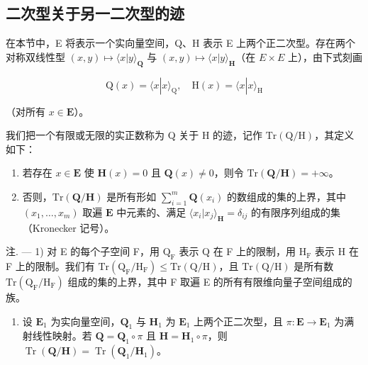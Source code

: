 \subsection{二次型关于另一二次型的迹}

在本节中，E 将表示一个实向量空间，Q、H 表示 E 上两个正二次型。存在两个对称双线性型 \((x, y) \mapsto \langle x | y \rangle_{\mathbf{Q}}\) 与 \((x, y) \mapsto \langle x | y \rangle_{\mathbf{H}}\)（在 \(E \times E\) 上），由下式刻画

\[
\mathrm{Q} (x) = \langle x | x \rangle_ {\mathrm{Q}}, \quad \mathrm{H} (x) = \langle x | x \rangle_ {\mathrm{H}}
\]

（对所有 \(x \in \mathbf{E}\)）。

我们把一个有限或无限的实正数称为 Q 关于 H 的迹，记作 \(\mathrm{Tr}(\mathrm{Q}/\mathrm{H})\)，其定义如下：

\begin{enumerate}
\def\labelenumi{\alph{enumi})}
\tightlist
\item
  若存在 \(x \in \mathbf{E}\) 使 \(\mathbf{H}(x) = 0\) 且 \(\mathbf{Q}(x) \neq 0\)，则令 \(\mathrm{Tr}(\mathbf{Q} / \mathbf{H}) = +\infty\)。
\item
  否则，\(\mathrm{Tr}(\mathbf{Q} / \mathbf{H})\) 是所有形如 \(\sum_{i=1}^{m} \mathbf{Q}(x_i)\) 的数组成的集的上界，其中 \((x_1, \ldots, x_m)\) 取遍 \(\mathbf{E}\) 中元素的、满足 \(\langle x_i | x_j \rangle_{\mathbf{H}} = \delta_{ij}\) 的有限序列组成的集（Kronecker 记号）。
\end{enumerate}

注. --- 1) 对 E 的每个子空间 F，用 \(\mathrm{Q}_{\mathrm{F}}\) 表示 Q 在 F 上的限制，用 \(\mathrm{H}_{\mathrm{F}}\) 表示 H 在 F 上的限制。我们有 \(\mathrm{Tr}(\mathrm{Q}_{\mathrm{F}} / \mathrm{H}_{\mathrm{F}}) \leqslant \mathrm{Tr}(\mathrm{Q} / \mathrm{H})\)，且 \(\mathrm{Tr}(\mathrm{Q} / \mathrm{H})\) 是所有数 \(\mathrm{Tr}(\mathrm{Q}_{\mathrm{F}} / \mathrm{H}_{\mathrm{F}})\) 组成的集的上界，其中 F 取遍 E 的所有有限维向量子空间组成的族。

\begin{enumerate}
\def\labelenumi{\arabic{enumi})}
\setcounter{enumi}{1}
\tightlist
\item
  设 \(\mathbf{E}_1\) 为实向量空间，\(\mathbf{Q}_1\) 与 \(\mathbf{H}_1\) 为 \(\mathbf{E}_1\) 上两个正二次型，且 \(\pi: \mathbf{E} \to \mathbf{E}_1\) 为满射线性映射。若 \(\mathbf{Q} = \mathbf{Q}_1 \circ \pi\) 且 \(\mathbf{H} = \mathbf{H}_1 \circ \pi\)，则 \(\operatorname{Tr}(\mathbf{Q}/\mathbf{H}) = \operatorname{Tr}(\mathbf{Q}_1/\mathbf{H}_1)\)。
\end{enumerate}

